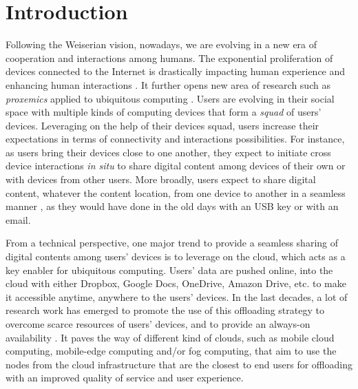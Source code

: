 \section{Introduction}

Following the Weiserian vision, nowadays, we are
evolving in a new era of cooperation and interactions among humans.
The exponential proliferation of devices connected to the Internet is
drastically impacting human experience and enhancing human
interactions \cite{Dearman:2008, Oh:2017, Sohn:2008,Harper08}. It further opens new area of research such as
\textit{proxemics} applied to ubiquitous computing
\cite{Marquardt:2011}. Users are evolving in their social space with 
multiple kinds of computing devices that form a \textit{squad} of users'
devices. Leveraging on the help of their devices squad, users increase their expectations in
terms of connectivity and interactions possibilities. For instance, as users bring
their devices close to one another, they expect to initiate cross
device interactions \textit{in situ} to share digital content
\cite{Oh:2017} among devices of their own or with devices 
from other users. More broadly, users expect to share digital content,
whatever the content location, from one
device to another in a seamless manner \cite{Dearman:2008}, as they
would have done in the old days with an USB key or with an email. 

From a technical perspective, one major trend to provide a seamless
sharing of digital contents among users' devices is to leverage on the
cloud, which acts as a key enabler for ubiquitous computing. Users' data
are pushed online, into the cloud with either Dropbox, Google Docs,
OneDrive, Amazon Drive, etc. to make it accessible anytime,
anywhere to the users' devices.  In the last decades, a lot of research work has
emerged to promote the use of this offloading strategy to overcome scarce
resources of users' devices, and to provide an always-on availability
\cite{Zhang:2014,Gordon:2012,Chun:2011}. It paves the way of different kind
of clouds, such as mobile cloud computing, mobile-edge computing
and/or fog computing, that aim to use the nodes from the cloud
infrastructure that are the closest to end users
for offloading with an improved quality of service and user experience.

